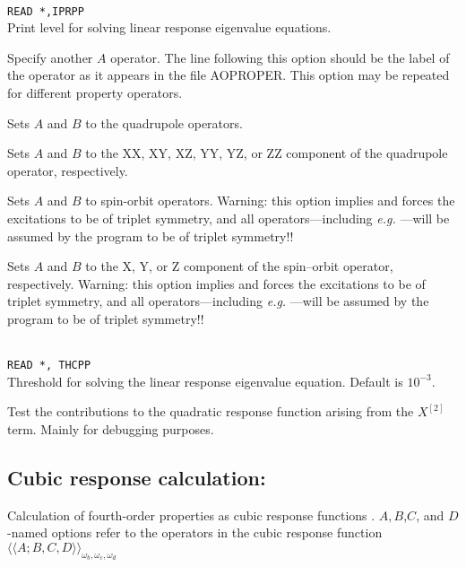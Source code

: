 \begin{description}
\item{}\\
\verb|READ *,IPRPP|\\
Print level for solving linear response eigenvalue equations.

\item[\Key{PROPRT}]
Specify another $A$ operator. The line following this
option should be the label of the operator as it appears in the file
AOPROPER. This option may be repeated for different property operators.

\item{}
Sets $A$ and $B$ to the quadrupole operators.

\item{}
Sets $A$ and $B$ to the XX, XY, XZ, YY, YZ, or ZZ component of the
quadrupole operator, respectively.


\item{}
Sets $A$ and $B$ to spin-orbit operators.
Warning: this option implies  and
forces the excitations to be of triplet symmetry,
and all operators---including
{\it e.g.\/} ---will be assumed by the program to be of triplet symmetry!!

\item{}
Sets $A$ and $B$ to the X, Y, or Z component of the spin--orbit
operator, respectively.
Warning: this option implies  and
forces the excitations to be of triplet symmetry,
and all operators---including
{\it e.g.\/} ---will be assumed by the program to be of triplet symmetry!!

\item{}\\
\verb|READ *, THCPP|\\
Threshold for solving the linear response
eigenvalue equation. Default is $10^{-3}$.

\item{}
Test the contributions to the quadratic response function arising from
the $X^{\left[2\right]}$ term. Mainly for debugging purposes.
\end{description}


\subsection{Cubic response calculation: }
Calculation of fourth-order properties as cubic response functions
\cite{pndjovhacpl242,djpnhajcp105,pndjhapdkrthhkcpl253}.
$A,B$,$C$, and $D$-named options refer to the operators in the cubic
response function
$\langle\!\langle A;B,C,D \rangle\!\rangle_{\omega_b,\omega_c,\omega_d}$

